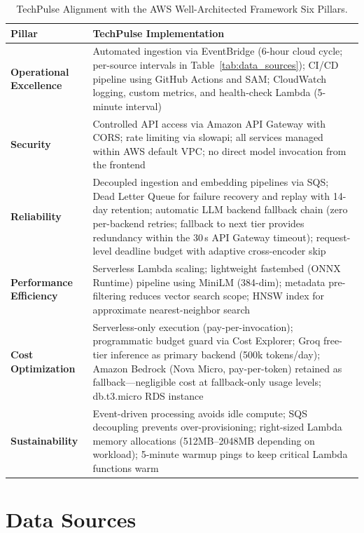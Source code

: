 \begin{table}[H]
\caption{TechPulse Alignment with the AWS Well-Architected Framework Six Pillars.}
\label{tab:well_arch}
\centering
\begin{tabular}{p{3.2cm}p{9.3cm}}
\toprule
\textbf{Pillar} & \textbf{TechPulse Implementation} \\
\midrule
\textbf{Operational Excellence} & Automated ingestion via EventBridge (6-hour cloud cycle; per-source intervals in Table~\ref{tab:data_sources}); CI/CD pipeline using GitHub Actions and SAM; CloudWatch logging, custom metrics, and health-check Lambda (5-minute interval) \\[4pt]
\textbf{Security} & Controlled API access via Amazon API Gateway with CORS; rate limiting via slowapi; all services managed within AWS default VPC; no direct model invocation from the frontend \\[4pt]
\textbf{Reliability} & Decoupled ingestion and embedding pipelines via SQS; Dead Letter Queue for failure recovery and replay with 14-day retention; automatic LLM backend fallback chain (zero per-backend retries; fallback to next tier provides redundancy within the 30\,s API Gateway timeout); request-level deadline budget with adaptive cross-encoder skip \\[4pt]
\textbf{Performance Efficiency} & Serverless Lambda scaling; lightweight fastembed (ONNX Runtime) pipeline using MiniLM (384-dim); metadata pre-filtering reduces vector search scope; HNSW index for approximate nearest-neighbor search \\[4pt]
\textbf{Cost Optimization} & Serverless-only execution (pay-per-invocation); programmatic budget guard via Cost Explorer; Groq free-tier inference as primary backend (500k tokens/day); Amazon Bedrock (Nova Micro, pay-per-token) retained as fallback---negligible cost at fallback-only usage levels; db.t3.micro RDS instance \\[4pt]
\textbf{Sustainability} & Event-driven processing avoids idle compute; SQS decoupling prevents over-provisioning; right-sized Lambda memory allocations (512MB--2048MB depending on workload); 5-minute warmup pings to keep critical Lambda functions warm \\
\bottomrule
\end{tabular}
\end{table}

\section{Data Sources}
\label{sec:data_sources}

